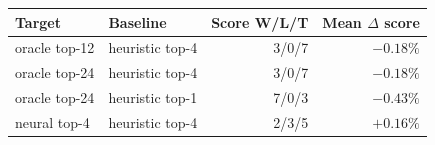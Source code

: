 \begin{tabular}{llrr}
\toprule
Target & Baseline & Score W/L/T & Mean $\Delta$ score \\
\midrule
oracle top-12 & heuristic top-4 & 3/0/7 & $-0.18\%$ \\
oracle top-24 & heuristic top-4 & 3/0/7 & $-0.18\%$ \\
oracle top-24 & heuristic top-1 & 7/0/3 & $-0.43\%$ \\
neural top-4 & heuristic top-4 & 2/3/5 & $+0.16\%$ \\
\bottomrule
\end{tabular}
